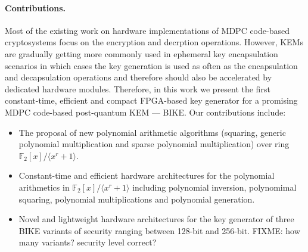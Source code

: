 \documentclass[runningheads]{llncs}
\begin{document}
\paragraph{Contributions.} Most of the existing work on hardware implementations of MDPC code-based
cryptosystems focus on the encryption and decrption operations.
However, KEMs are gradually getting more commonly used in ephemeral
key encapsulation scenarios in which cases the key
generation is used as often as the encapsulation and decapsulation operations
and therefore should also be accelerated by dedicated hardware modules.
Therefore, in this work we present the first constant-time, efficient and compact
FPGA-based key generator for a promising MDPC code-based post-quantum KEM \mbox{---} BIKE.
Our contributions include:
\begin{itemize}
  \item The proposal of new polynomial arithmetic algorithms (squaring, generic polynomial multiplication and sparse polynomial multiplication) over ring $\mathbb{F}_2[x]/\langle x^r+1\rangle$.
  \item Constant-time and efficient hardware architectures for the polynomial arithmetics
  in $\mathbb{F}_2[x]/\langle x^r+1\rangle$ including polynomial inversion, polynomimal squaring, polynomial multiplications and
  polynomial generation.
  \item Novel and lightweight hardware architectures for the key generator of three BIKE variants of security ranging
  between 128-bit and 256-bit. {\color{red} FIXME: how many variants? security level correct?}
\end{itemize}

\end{document}

